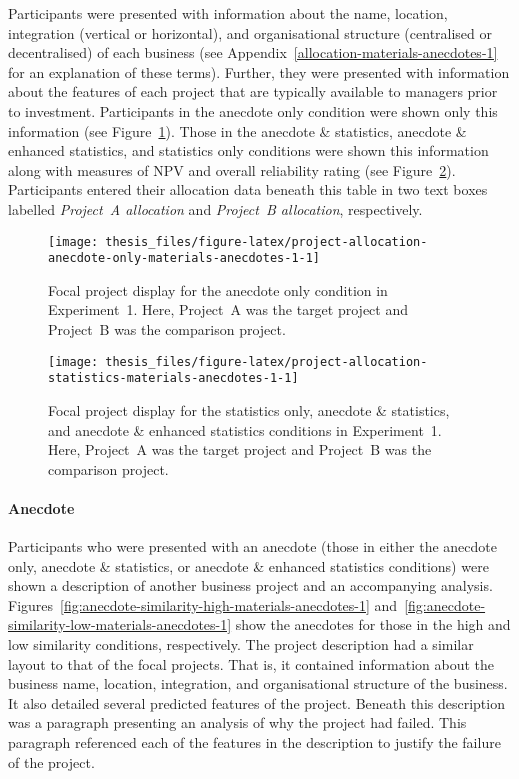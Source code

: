 \documentclass[a4paper, nobind]{templates/ociamthesis}
\theoremstyle{definition}
\theoremstyle{definition}
\theoremstyle{definition}
\theoremstyle{definition}
\theoremstyle{remark}
\begin{document}
Participants were presented with information about the name, location,
integration (vertical or horizontal), and organisational structure (centralised
or decentralised) of each business (see
Appendix~\ref{allocation-materials-anecdotes-1} for an explanation of these
terms). Further, they were presented with information about the features of each
project that are typically available to managers prior to investment.
Participants in the anecdote only condition were shown only this information
(see Figure~\ref{fig:project-allocation-anecdote-only-materials-anecdotes-1}).
Those in the anecdote \& statistics, anecdote \& enhanced statistics, and
statistics only conditions were shown this information along with measures of
NPV and overall reliability rating (see
Figure~\ref{fig:project-allocation-statistics-materials-anecdotes-1}).
Participants entered their allocation data beneath this table in two text boxes
labelled \emph{Project~A allocation} and \emph{Project~B allocation}, respectively.



\begin{figure}
\texttt{[image: thesis\_files/figure-latex/project-allocation-anecdote-only-materials-anecdotes-1-1]} \caption{Focal project display for the anecdote only condition in Experiment~1. Here, Project~A was the target project and Project~B was the comparison project.}\label{fig:project-allocation-anecdote-only-materials-anecdotes-1}
\end{figure}



\begin{figure}
\texttt{[image: thesis\_files/figure-latex/project-allocation-statistics-materials-anecdotes-1-1]} \caption{Focal project display for the statistics only, anecdote \& statistics, and anecdote \& enhanced statistics conditions in Experiment~1. Here, Project~A was the target project and Project~B was the comparison project.}\label{fig:project-allocation-statistics-materials-anecdotes-1}
\end{figure}

\paragraph{Anecdote}

Participants who were presented with an anecdote (those in either the anecdote
only, anecdote \& statistics, or anecdote \& enhanced statistics conditions) were
shown a description of another business project and an accompanying analysis.
Figures~\ref{fig:anecdote-similarity-high-materials-anecdotes-1}
and~\ref{fig:anecdote-similarity-low-materials-anecdotes-1} show the anecdotes
for those in the high and low similarity conditions, respectively. The project
description had a similar layout to that of the focal projects. That is, it
contained information about the business name, location, integration, and
organisational structure of the business. It also detailed several predicted
features of the project. Beneath this description was a paragraph presenting an
analysis of why the project had failed. This paragraph referenced each of the
features in the description to justify the failure of the project.
\end{document}
